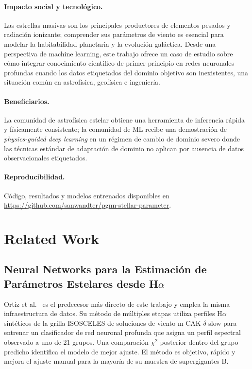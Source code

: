 \documentclass[sigconf,ACM]{acmart}
\begin{document}
\paragraph{Impacto social y tecnológico.} Las estrellas masivas son los principales productores de elementos pesados y radiación ionizante; comprender sus parámetros de viento es esencial para modelar la habitabilidad planetaria y la evolución galáctica. Desde una perspectiva de machine learning, este trabajo ofrece un caso de estudio sobre cómo integrar conocimiento científico de primer principio en redes neuronales profundas cuando los datos etiquetados del dominio objetivo son inexistentes, una situación común en astrofísica, geofísica e ingeniería.

\paragraph{Beneficiarios.} La comunidad de astrofísica estelar obtiene una herramienta de inferencia rápida y físicamente consistente; la comunidad de ML recibe una demostración de \emph{physics-guided deep learning} en un régimen de cambio de dominio severo donde las técnicas estándar de adaptación de dominio no aplican por ausencia de datos observacionales etiquetados.

\paragraph{Reproducibilidad.} Código, resultados y modelos entrenados disponibles en \url{https://github.com/sanwandter/pgnn-stellar-parameter}.

\section{Related Work}

\subsection{Neural Networks para la Estimación de Parámetros Estelares desde H$\alpha$}

Ortiz et al.~\cite{Ortiz2025} es el predecesor más directo de este trabajo y emplea la misma infraestructura de datos. Su método de múltiples etapas utiliza perfiles H$\alpha$ sintéticos de la grilla ISOSCELES de soluciones de viento m-CAK $\delta$-slow para entrenar un clasificador de red neuronal profunda que asigna un perfil espectral observado a uno de 21 grupos. Una comparación $\chi^2$ posterior dentro del grupo predicho identifica el modelo de mejor ajuste. El método es objetivo, rápido y mejora el ajuste manual para la mayoría de su muestra de supergigantes B.
\end{document}
